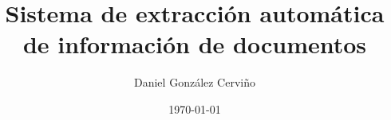\documentclass[12pt,a4paper]{report}
\title{Sistema de extracción automática de información de documentos}
\author{Daniel González Cerviño}
\date{\today}
\begin{document}
    
%    



\tableofcontents
    \listoffigures
    \listoftables

    

    \providecommand{\keywords}[1]
    {
        \small
        \textbf{\textit{keywords :\hspace{0.3cm}}} #1
    }
    

    
    
%    

%    
%    

    
    
\end{document}
